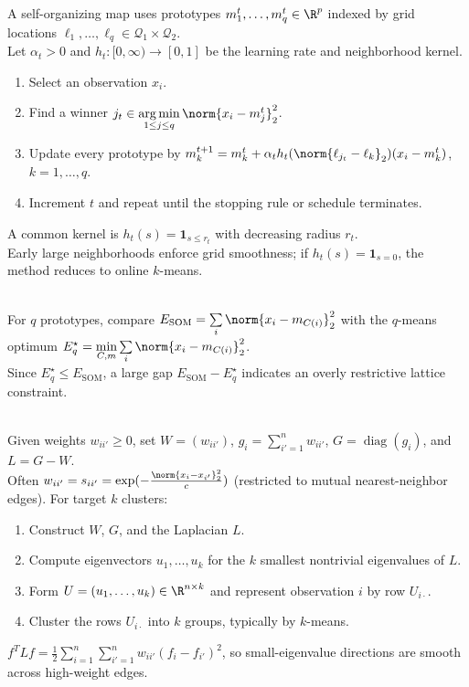 \begin{method} \label{meth:sl-self-organizing-map} \\
A self-organizing map uses prototypes $m_1^t,\ldots,m_q^t\in\R^p$ indexed by grid locations $\ell_1,\ldots,\ell_q\in\mathcal Q_1\times\mathcal Q_2$.\\
Let $\alpha_t>0$ and $h_t:[0,\infty)\to[0,1]$ be the learning rate and neighborhood kernel.
\begin{enumerate}[label=(\roman*)]
\setlength{\itemsep}{0pt}
\item Select an observation $x_i$.
\item Find a winner $j_t\in\operatorname*{arg\,min}\limits_{1\leq j\leq q}\norm{x_i-m_j^t}_2^2$.
\item Update every prototype by $m_k^{t+1}=m_k^t+\alpha_t h_t(\norm{\ell_{j_t}-\ell_k}_2)(x_i-m_k^t)$, $k=1,\ldots,q$.
\item Increment $t$ and repeat until the stopping rule or schedule terminates.
\end{enumerate}
A common kernel is $h_t(s)=\mathbf{1}_{s\leq r_t}$ with decreasing radius $r_t$.\\
Early large neighborhoods enforce grid smoothness; if $h_t(s)=\mathbf{1}_{s=0}$, the method reduces to online $k$-means.
\end{method}

\begin{remark} \label{rem:sl-som-reconstruction-check} \\
For $q$ prototypes, compare $E_{\mathrm{SOM}}=\sum\limits_i\norm{x_i-m_{C(i)}}_2^2$ with the $q$-means optimum $E_q^\star=\min\limits_{C,m}\sum\limits_i\norm{x_i-m_{C(i)}}_2^2$.\\
Since $E_q^\star\leq E_{\mathrm{SOM}}$, a large gap $E_{\mathrm{SOM}}-E_q^\star$ indicates an overly restrictive lattice constraint.
\end{remark}

\begin{method} \label{meth:sl-spectral-clustering} \\
Given weights $w_{ii'}\geq0$, set $W=(w_{ii'})$, $g_i=\sum\limits_{i'=1}^n w_{ii'}$, $G=\operatorname{diag}(g_i)$, and $L=G-W$.\\
Often $w_{ii'}=s_{ii'}=\exp(-\frac{\norm{x_i-x_{i'}}_2^2}{c})$ (restricted to mutual nearest-neighbor edges). For target $k$ clusters:
\begin{enumerate}[label=(\roman*)]
\setlength{\itemsep}{0pt}
\item Construct $W$, $G$, and the Laplacian $L$.
\item Compute eigenvectors $u_1,\ldots,u_k$ for the $k$ smallest nontrivial eigenvalues of $L$.
\item Form $U=(u_1,\ldots,u_k)\in\R^{n\times k}$ and represent observation $i$ by row $U_{i\cdot}$.
\item Cluster the rows $U_{i\cdot}$ into $k$ groups, typically by $k$-means.
\end{enumerate}
$f^TLf=\frac{1}{2}\sum\limits_{i=1}^n\sum\limits_{i'=1}^n w_{ii'}(f_i-f_{i'})^2$, so small-eigenvalue directions are smooth across high-weight edges.
\end{method}


